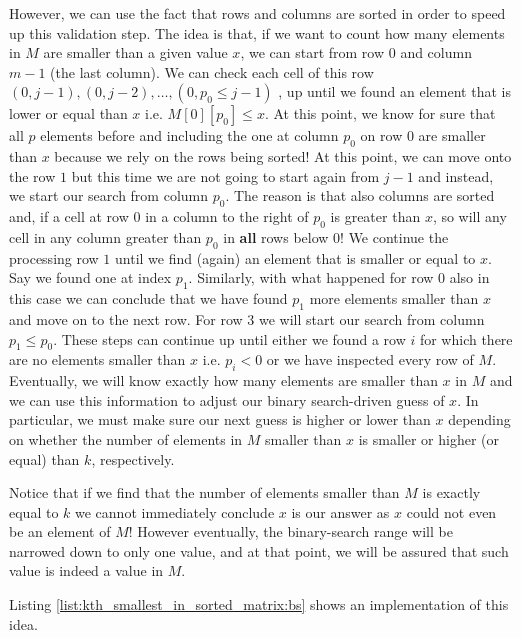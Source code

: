 However, we can use the fact that rows and columns are sorted in order to speed up this validation step. The idea is that, if we want to count how many elements in $M$ are smaller than a given value $x$, we can start from row $0$ and column $m-1$ (the last column). We can check each cell of this row $(0,j-1),(0,j-2),\ldots,(0,p_0 \leq j-1)$ , up until we found an element that is lower or equal than $x$ i.e. $M[0][p_0] \leq x$. At this point, we know for sure that all $p$ elements before and including the one at column $p_0$ on row $0$ are smaller than $x$ because we rely on the rows being sorted!
At this point, we can move onto the row $1$ but this time we are not going to start again from $j-1$ and instead, we start our search from column $p_0$. The reason is that also columns are sorted and, if a cell at row $0$ in a column to the right of $p_0$ is greater than $x$, so will any cell in any column greater than $p_0$ in \textbf{all} rows below $0$!
We continue the processing row $1$ until we find (again) an element that is smaller or equal to $x$. Say we found one at index $p_1$. Similarly, with what happened for row $0$ also in this case we can conclude that we have found $p_1$ more elements smaller than $x$ and move on to the next row. For row $3$ we will start our search from column $p_1 \leq p_0$.
These steps can continue up until either we found a row $i$ for which there are no elements smaller than $x$ i.e. $p_i < 0$ or we have inspected every row of $M$.
Eventually, we will know exactly how many elements are smaller than $x$ in $M$ and we can use this information to adjust our binary search-driven guess of $x$.
In particular, we must make sure our next guess is higher or lower than $x$ depending on whether the number of elements in $M$ smaller than $x$ is smaller or higher (or equal) than $k$, respectively.

Notice that if we find that the number of elements smaller than $M$ is exactly equal to $k$ we cannot immediately conclude $x$ is our answer as $x$ could not even be an element of $M$! However eventually, the binary-search range will be narrowed down to only one value, and at that point, we will be assured that such value is indeed a value in $M$.

Listing \ref{list:kth_smallest_in_sorted_matrix:bs} shows an implementation of this idea.



